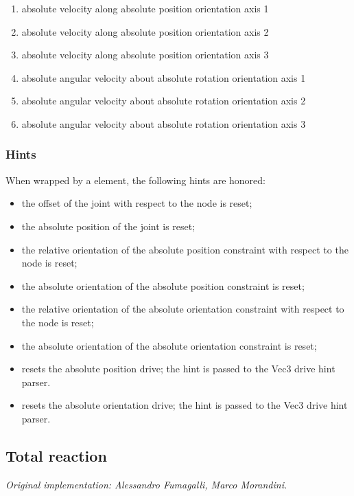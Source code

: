 \begin{enumerate}
\item {} absolute velocity along absolute position orientation axis 1
\item {} absolute velocity along absolute position orientation axis 2
\item {} absolute velocity along absolute position orientation axis 3

\item {} absolute angular velocity about absolute rotation orientation axis 1
\item {} absolute angular velocity about absolute rotation orientation axis 2
\item {} absolute angular velocity about absolute rotation orientation axis 3
\end{enumerate}

\subsubsection{Hints}
When wrapped by a  element, the following hints are honored:
\begin{itemize}
\item {} the offset of the joint
with respect to the node is reset;
\item {} the absolute position of the joint
is reset;
\item {} the relative orientation
of the absolute position constraint with respect to the node is reset;
\item {} the absolute orientation 
of the absolute position constraint is reset;
\item {} the relative orientation
of the absolute orientation constraint with respect to the node is reset;
\item {} the absolute orientation 
of the absolute orientation constraint is reset;
\item {} resets the absolute position drive;
the hint is passed to the Vec3 drive hint parser.
\item {} resets the absolute orientation drive;
the hint is passed to the Vec3 drive hint parser.
\end{itemize}



\subsection{Total reaction}
\label{sec:EL:STRUCT:JOINT:TOTAL_REACTION}
\emph{Original implementation: Alessandro Fumagalli, Marco Morandini.}

